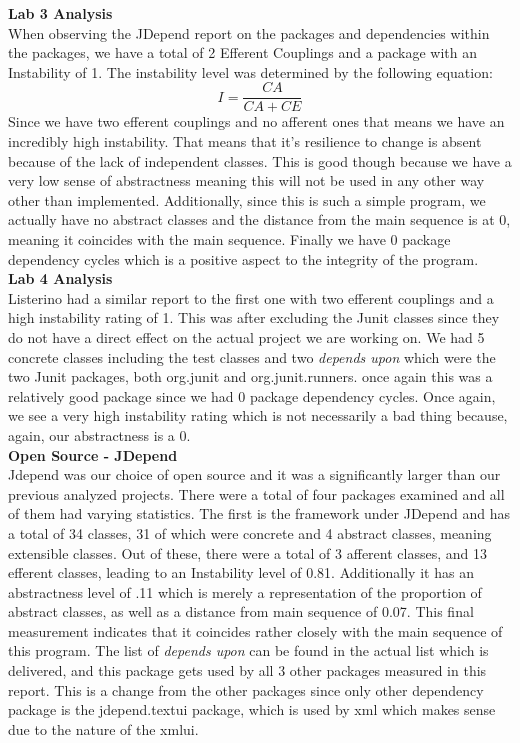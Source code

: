 \documentclass[12pt]{article}
\begin{document}
\textbf{Lab 3 Analysis}\\
When observing the JDepend report on the packages and dependencies within the packages, we have a total of 2 Efferent Couplings and a package with an Instability of 1.  The instability level was determined by the following equation:
\begin{equation}
I = \frac{CA}{CA+CE}
\end{equation}
Since we have two efferent couplings and no afferent ones that means we have an incredibly high instability.  That means that it’s resilience to change is absent because of the lack of independent classes.  This is good though because we have a very low sense of abstractness meaning this will not be used in any other way other than implemented.  Additionally, since this is such a simple program, we actually have no abstract classes and the distance from the main sequence is at 0, meaning it coincides with the main sequence.  Finally we have 0 package dependency cycles which is a positive aspect to the integrity of the program.\\

\textbf{Lab 4 Analysis}\\
Listerino had a similar report to the first one with two efferent couplings and a high instability rating of 1.  This was after excluding the Junit classes since they do not have a direct effect on the actual project we are working on.  We had 5 concrete classes including the test classes and two \textit{depends upon} which were the two Junit packages, both org.junit and org.junit.runners.  once again this was a relatively good package since we had 0 package dependency cycles.  Once again, we see a very high instability rating which is not necessarily a bad thing because, again, our abstractness is a 0. \\

\textbf{Open Source - JDepend}\\
Jdepend was our choice of open source and it was a significantly larger than our previous analyzed projects.  There were a total of four packages examined and all of them had varying statistics.  The first is the framework under JDepend and has a total of 34 classes, 31 of which were concrete and 4 abstract classes, meaning extensible classes.  Out of these, there were a total of 3 afferent classes, and 13 efferent classes, leading to an Instability level of 0.81.  Additionally it has an abstractness level of .11 which is merely a representation of the proportion of abstract classes, as well as a distance from main sequence of 0.07.  This final measurement indicates that it coincides rather closely with the main sequence of this program.  The list of \textit{depends upon} can be found in the actual list which is delivered, and this package gets used by all 3 other packages measured in this report.  This is a change from the other packages since only other dependency package is the jdepend.textui package, which is used by xml which makes sense due to the nature of the xmlui.   \\
\end{document}
